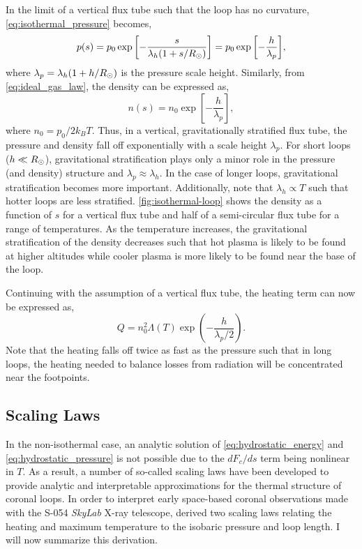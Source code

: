 In the limit of a vertical flux tube such that the loop has no curvature, \autoref{eq:isothermal_pressure} becomes,
\begin{equation}\label{eq:isothermal_pressure_vertical}
    p(s) = p_0\exp{\left[-\frac{s}{\lambda_h(1 + s/R_\odot)}\right]} = p_0\exp{\left[-\frac{h}{\lambda_p}\right]},
\end{equation}
where $\lambda_p=\lambda_h(1 + h/R_\odot)$ is the pressure scale height. Similarly, from \autoref{eq:ideal_gas_law}, the density can be expressed as,
\begin{equation*}
    n(s) = n_0\exp{\left[-\frac{h}{\lambda_p}\right]},
\end{equation*} 
where $n_0=p_0/2k_BT$. Thus, in a vertical, gravitationally stratified flux tube, the pressure and density fall off exponentially with a scale height $\lambda_p$. For short loops ($h\ll R_\odot$), gravitational stratification plays only a minor role in the pressure (and density) structure and $\lambda_p\approx\lambda_h$. In the case of longer loops, gravitational stratification becomes more important. Additionally, note that $\lambda_h\propto T$ such that hotter loops are less stratified. \autoref{fig:isothermal-loop} shows the density as a function of $s$ for a vertical flux tube and half of a semi-circular flux tube for a range of temperatures. As the temperature increases, the gravitational stratification of the density decreases such that hot plasma is likely to be found at higher altitudes while cooler plasma is more likely to be found near the base of the loop.

Continuing with the assumption of a vertical flux tube, the heating term can now be expressed as,
\begin{equation}
    Q = n_0^2 \Lambda(T) \exp{\left(-\frac{h}{\lambda_p/2}\right)}.
\end{equation}
Note that the heating falls off twice as fast as the pressure such that in long loops, the heating needed to balance losses from radiation will be concentrated near the footpoints.

\subsection{Scaling Laws}\label{sec:scaling_laws}

In the non-isothermal case, an analytic solution of \autoref{eq:hydrostatic_energy} and \autoref{eq:hydrostatic_pressure} is not possible due to the $dF_c/ds$ term being nonlinear in $T$. As a result, a number of so-called scaling laws have been developed to provide analytic and interpretable approximations for the thermal structure of coronal loops. In order to interpret early space-based coronal observations made with the S-054 \textit{SkyLab} X-ray telescope, \citet{rosner_dynamics_1978} derived two scaling laws relating the heating and maximum temperature to the isobaric pressure and loop length. I will now summarize this derivation.

